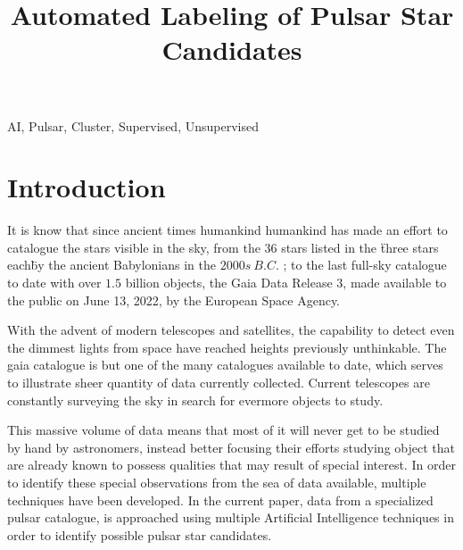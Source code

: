 \documentclass[conference]{IEEEtran}
\begin{document}
\title{Automated Labeling of Pulsar Star Candidates}

\author{
    }

\maketitle

\begin{abstract}
    \todo{}
\end{abstract}

\begin{IEEEkeywords}
    AI, Pulsar, Cluster, Supervised, Unsupervised
\end{IEEEkeywords}

\section{Introduction}
It is know that since ancient times humankind humankind has made an effort to
catalogue the stars visible in the sky, from the $36$ stars listed in the
\"three stars each\" by the ancient Babylonians in the $2000s\ B.C.$
\cite{astronomy:history:dick}; to the last full-sky catalogue to date with over
$1.5$ billion objects, the Gaia Data Release 3\cite{gaia:dr3}, made available
to the public on June 13, 2022, by the European Space Agency.

With the advent of modern telescopes and satellites, the capability to detect
even the dimmest lights from space have reached heights previously unthinkable.
The gaia catalogue is but one of the many catalogues available to date, which
serves to illustrate sheer quantity of data currently collected. Current
telescopes are constantly surveying the sky in search for evermore objects to study.

This massive volume of data means that most of it will never get to be studied
by hand by astronomers, instead better focusing their efforts studying object
that are already known to possess qualities that may result of special interest.
In order to identify these special observations from the sea of data available,
multiple techniques have been developed.\cite{pulsar:dataset:oxford} In the
current paper, data from a specialized pulsar catalogue\cite{pulsar:dataset},
is approached using multiple Artificial Intelligence techniques in order to
identify possible pulsar star candidates.
\end{document}
